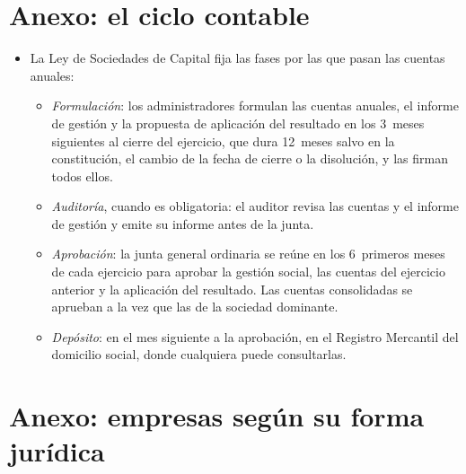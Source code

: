 \documentclass[11pt]{article}
\begin{document}
\section{Anexo: el ciclo contable}\label{anexo:ciclo-contable}

\begin{itemize}
\item La Ley de Sociedades de Capital fija las fases por las que pasan las cuentas anuales\nocite{LSC2010}:
  \begin{itemize}
  \item \emph{Formulación}: los administradores formulan las cuentas anuales, el informe de gestión y la propuesta de aplicación del resultado en los 3~meses siguientes al cierre del ejercicio, que dura 12~meses salvo en la constitución, el cambio de la fecha de cierre o la disolución, y las firman todos ellos.
  \item \emph{Auditoría}, cuando es obligatoria: el auditor revisa las cuentas y el informe de gestión y emite su informe antes de la junta.
  \item \emph{Aprobación}: la junta general ordinaria se reúne en los 6~primeros meses de cada ejercicio para aprobar la gestión social, las cuentas del ejercicio anterior y la aplicación del resultado. Las cuentas consolidadas se aprueban a la vez que las de la sociedad dominante.
  \item \emph{Depósito}: en el mes siguiente a la aprobación, en el Registro Mercantil del domicilio social, donde cualquiera puede consultarlas.
  \end{itemize}
\end{itemize}

\section{Anexo: empresas según su forma jurídica}\label{anexo:formas-juridicas}
\end{document}
